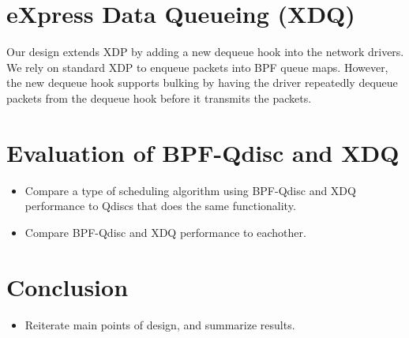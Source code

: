 \documentclass[sigconf, nonacm]{acmart}
\begin{document}
\section{eXpress Data Queueing (XDQ)}

Our design extends XDP by adding a new dequeue hook into the network drivers. We
rely on standard XDP to enqueue packets into BPF queue maps. However, the new
dequeue hook supports bulking by having the driver repeatedly dequeue packets
from the dequeue hook before it transmits the packets.


\section{Evaluation of BPF-Qdisc and XDQ}

\begin{itemize}
  \item Compare a type of scheduling algorithm using BPF-Qdisc and XDQ performance to Qdiscs that does the same functionality.
  \item Compare BPF-Qdisc and XDQ performance to eachother.
\end{itemize}

\section{Conclusion}

\begin{itemize}
  \item Reiterate main points of design, and summarize results.
\end{itemize}





\end{document}
